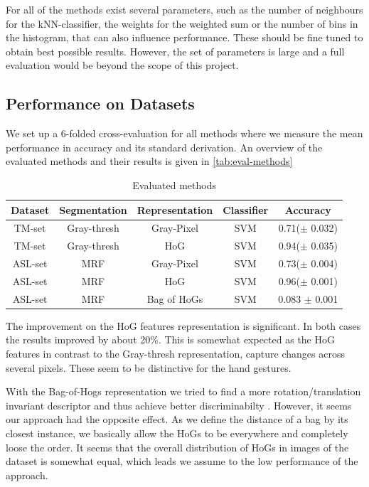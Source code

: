 \documentclass[letterpaper, 10 pt, conference]{ieeeconf}  %
\begin{document}
For all of the methods exist several parameters, such as the number of neighbours for the kNN-classifier, the weights for the weighted sum or the number of bins in the histogram, that can also influence performance. These should be fine tuned to obtain best possible results. However, the set of parameters is large and a full evaluation would be beyond the scope of this project. 

\subsection{Performance on Datasets}

We set up a 6-folded cross-evaluation for all methods where we measure the mean performance in accuracy and its standard derivation. An overview of the evaluated methods and their results is given in \autoref{tab:eval-methods}

\begin{table}[h]
\caption{Evaluated methods}
\label{tab:eval-methods}
\begin{center}
\begin{tabular}{c|c|c|c|c}
Dataset & Segmentation & Representation & Classifier & Accuracy \\
\hline
\hline
TM-set & Gray-thresh & Gray-Pixel & SVM & 0.71($\pm$ 0.032)\\
TM-set & Gray-thresh & HoG & SVM & 0.94($\pm$ 0.035)\\
ASL-set & MRF & Gray-Pixel & SVM & 0.73($\pm$ 0.004)\\ 
ASL-set & MRF & HoG & SVM & 0.96($\pm$ 0.001)\\
ASL-set & MRF & Bag of HoGs & SVM & 0.083 $\pm$ 0.001\\
\hline
\end{tabular}
\end{center}
\end{table}

The improvement on the HoG features representation is significant. In both cases the results improved by about 20\%. This is somewhat expected as the HoG features in contrast to the Gray-thresh representation, capture changes across several pixels. These seem to be distinctive for the hand gestures.

With the Bag-of-Hogs representation we tried to find a more rotation/translation invariant descriptor and thus achieve better discriminabilty . However, it seems our approach had the opposite effect. As we define the distance of a bag by its closest instance, we basically allow the HoGs to be everywhere and completely loose the order. It seems that the overall distribution of HoGs in images of the dataset is somewhat equal, which leads we assume to the low performance of the approach.
\end{document}
